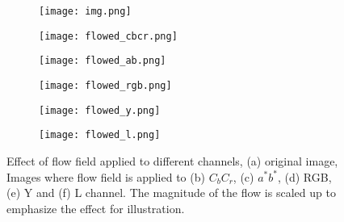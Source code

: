 \begin{figure}[t]
    \centering
    \begin{subfigure}[b]{.30\linewidth}
        \texttt{[image: img.png]}
        \caption{}
    \end{subfigure}
    \begin{subfigure}[b]{.30\linewidth}
        \texttt{[image: flowed\_cbcr.png]}
        \caption{}
    \end{subfigure}
    \begin{subfigure}[b]{.30\linewidth}
        \texttt{[image: flowed\_ab.png]}
        \caption{}
    \end{subfigure}
    \begin{subfigure}[b]{.30\linewidth}
        \texttt{[image: flowed\_rgb.png]}
        \caption{}
    \end{subfigure}
    \begin{subfigure}[b]{.30\linewidth}
        \texttt{[image: flowed\_y.png]}
        \caption{}
    \end{subfigure}
    \begin{subfigure}[b]{.30\linewidth}
        \texttt{[image: flowed\_l.png]}
        \caption{}
    \end{subfigure}
    \caption{Effect of flow field applied to different channels, (a) original image, Images where flow field is applied to (b) \(C_{b}C_{r}\), (c) \(a^*b^*\), (d) RGB, (e) Y and (f) L channel. The magnitude of the flow is scaled up to emphasize the effect for illustration.}\label{fig:flowtochannels}
\end{figure}

